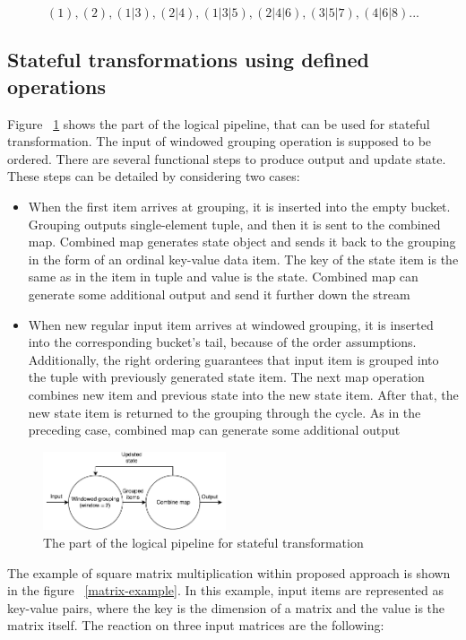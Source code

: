 \[(1), (2), (1|3), (2|4), (1|3|5), (2|4|6), (3|5|7), (4|6|8)...\]

\subsection{Stateful transformations using defined operations}
Figure ~\ref{stateful-schema} shows the part of the logical pipeline, that can be used for stateful transformation. The input of windowed grouping operation is supposed to be ordered. There are several functional steps to produce output and update state. These steps can be detailed by considering two cases:

\begin{itemize}
    \item When the first item arrives at grouping, it is inserted into the empty bucket. Grouping outputs single-element tuple, and then it is sent to the combined map. Combined map generates state object and sends it back to the grouping in the form of an ordinal key-value data item. The key of the state item is the same as in the item in tuple and value is the state. Combined map can generate some additional output and send it further down the stream
    \item When new regular input item arrives at windowed grouping, it is inserted into the corresponding bucket's tail, because of the order assumptions. Additionally, the right ordering guarantees that input item is grouped into the tuple with previously generated state item. The next map operation combines new item and previous state into the new state item. After that, the new state item is returned to the grouping through the cycle. As in the preceding case, combined map can generate some additional output
\end{itemize}

\begin{figure}[htbp]
  \centering
  \includegraphics[width=0.48\textwidth]{pics/stateful-schema}
  \caption{The part of the logical pipeline for stateful transformation}
  \label {stateful-schema}
\end{figure}

The example of square matrix multiplication within proposed approach is shown in the figure ~\ref{matrix-example}. In this example, input items are represented as key-value pairs, where the key is the dimension of a matrix and the value is the matrix itself. The reaction on three input matrices are the following:

